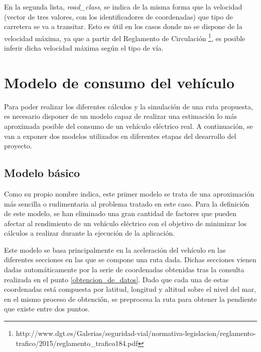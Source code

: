 \documentclass[11pt,spanish,listoffigures,listoftables]{tfgetsinf}
\begin{document}
En la segunda lista, \textit{road\_class}, se indica de la misma forma que la velocidad (vector de tres valores, con los identificadores de coordenadas) que tipo de carretera se va a transitar. Esto es útil en los casos donde no se dispone de la velocidad máxima, ya que a partir del Reglamento de Circulación \footnote{http://www.dgt.es/Galerias/seguridad-vial/normativa-legislacion/reglamento-trafico/2015/reglamento\_trafico184.pdf}, es posible inferir dicha velocidad máxima según el tipo de vía.

\newpage
\section{Modelo de consumo del vehículo}
Para poder realizar los diferentes cálculos y la simulación de una ruta propuesta, es necesario disponer de un modelo capaz de realizar una estimación lo más aproximada posible del consumo de un vehículo eléctrico real. A continuación, se van a exponer dos modelos utilizados en diferentes etapas del desarrollo del proyecto.

\subsection{Modelo básico}
Como su propio nombre indica, este primer modelo se trata de una aproximación más sencilla o rudimentaria al problema tratado en este caso. Para la definición de este modelo, se han eliminado una gran cantidad de factores que pueden afectar al rendimiento de un vehículo eléctrico con el objetivo de minimizar los cálculos a realizar durante la ejecución de la aplicación.

Este modelo se basa principalmente en la aceleración del vehículo en las diferentes secciones en las que se compone una ruta dada. Dichas secciones vienen dadas automáticamente por la serie de coordenadas obtenidas tras la consulta realizada en el punto \ref{obtencion_de_datos}. Dado que cada una de estas coordenadas está compuesta por latitud, longitud y altitud sobre el nivel del mar, en el mismo proceso de obtención, se preprocesa la ruta para obtener la pendiente que existe entre dos puntos.
\end{document}
